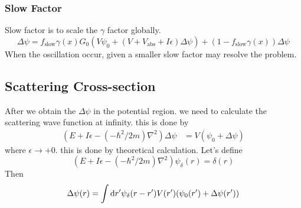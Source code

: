 \documentclass[12pt,twoside]{article}
\def\df{{\rm d}}
\begin{document}
\subsubsection{Slow Factor}
Slow factor is to scale the $\gamma$ factor globally.
$$\Delta\psi = f_\text{slow} \gamma(x) G_0(V\psi_0 + (V+V_\text{abs} + I\epsilon)\Delta \psi) + (1- f_\text{slow}\gamma(x))\Delta \psi$$
When the oscillation occur, given a smaller slow factor may resolve the problem.

\subsection{Scattering Cross-section}

After we obtain the $\Delta \psi$ in the potential region. we need to calculate the scattering wave function at infinity. this is done by
\begin{align}
(E + I\epsilon -(-\hbar^2/2m)\nabla^2)\Delta\psi &= V(\psi_0 + \Delta \psi)
\end{align}
where $\epsilon\rightarrow +0$. this is done by theoretical calculation.
Let's define
$$
(E + I\epsilon -(-\hbar^2/2m)\nabla^2)\psi_\delta(r) = \delta(r)
$$
Then
$$
\Delta\psi(r) = \int \df r^\prime \psi_\delta(r-r^\prime) V(r^\prime)(\psi_0(r^\prime) + \Delta\psi(r^\prime))
$$
\end{document}
